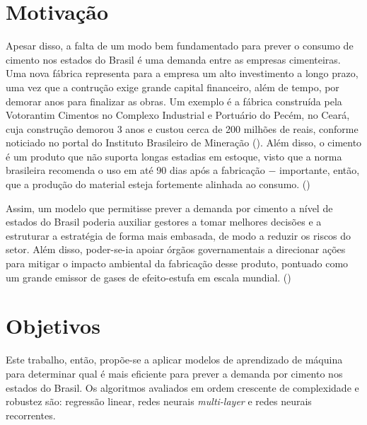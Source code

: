 \section*{Motivação}

Apesar disso, a falta de um modo bem fundamentado para prever o 
consumo de cimento nos estados do Brasil é 
uma demanda entre as empresas cimenteiras. Uma nova fábrica 
representa para a empresa um alto investimento a longo prazo,
uma vez que a contrução exige grande capital
financeiro, além de tempo, por demorar anos para finalizar as obras. 
Um exemplo é a fábrica construída pela Votorantim Cimentos no Complexo 
Industrial e Portuário do Pecém, no Ceará, cuja construção 
demorou 3 anos e custou cerca de 200 milhões de reais, conforme 
noticiado no portal do Instituto Brasileiro de Mineração 
(\cite{fabrica-noticia}).
Além disso, o cimento é um produto que não suporta longas 
estadias em estoque, visto que a norma brasileira recomenda
o uso em até 90 dias após a fabricação $-$ importante, então, que 
a produção do material esteja fortemente alinhada ao 
consumo. (\cite{abnt})

Assim, um modelo que permitisse prever a demanda por cimento a nível de 
estados do Brasil poderia auxiliar gestores a tomar melhores 
decisões e a estruturar a estratégia de forma mais embasada, de 
modo a reduzir os riscos do setor. Além disso, poder-se-ia apoiar órgãos 
governamentais a direcionar ações para mitigar o impacto ambiental da
fabricação desse produto, pontuado como um grande emissor de 
gases de efeito-estufa em escala mundial. (\cite{meio-ambiente})


\section*{Objetivos}

Este trabalho, então, propõe-se a  aplicar modelos de aprendizado 
de máquina para determinar qual é mais eficiente para prever a 
demanda por cimento nos estados do Brasil. Os algoritmos avaliados em ordem 
crescente de complexidade e robustez são: 
regressão linear, redes neurais \textit{multi-layer} 
e redes neurais recorrentes.




